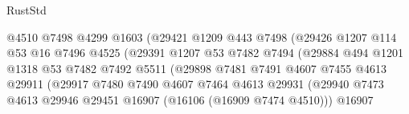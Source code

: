\begin{lexlean}{RustStd}
\begin{coremodule}
                                      @4510
                                      @7498
                                      @4299
                                      @1603
                                      (@29421
                                        @1209
                                        @443
                                        @7498
                                        (@29426
                                          @1207
                                          @114
                                          @53
                                          @16
                                          @7496
                                          @4525
                                          (@29391
                                            @1207
                                            @53
                                            @7482
                                            @7494
                                            (@29884
                                              @494
                                              @1201
                                              @1318
                                              @53
                                              @7482
                                              @7492
                                              @5511
                                              (@29898
                                                @7481
                                                @7491
                                                @4607
                                                @7455
                                                @4613
                                                @29911
                                                (@29917
                                                  @7480
                                                  @7490
                                                  @4607
                                                  @7464
                                                  @4613
                                                  @29931
                                                  (@29940
                                                    @7473
                                                    @4613
                                                    @29946
                                                    @29451
                                                    @16907
                                                    (@16106 (@16909 @7474 @4510)))
                                                  @16907

\end{coremodule}
\end{lexlean}

